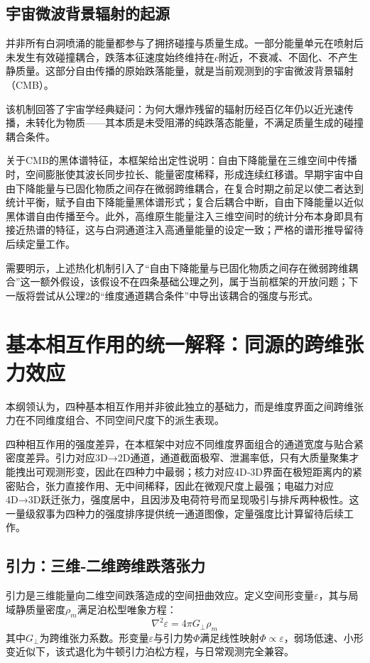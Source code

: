 \documentclass[UTF8]{csoarticle}
\begin{document}
\subsection{宇宙微波背景辐射的起源}
并非所有白洞喷涌的能量都参与了拥挤碰撞与质量生成。一部分能量单元在喷射后未发生有效碰撞耦合，跌落本征速度始终维持在$c$附近，不衰减、不固化、不产生静质量。这部分自由传播的原始跌落能量，就是当前观测到的宇宙微波背景辐射（CMB）。

该机制回答了宇宙学经典疑问：为何大爆炸残留的辐射历经百亿年仍以近光速传播，未转化为物质——其本质是未受阻滞的纯跌落态能量，不满足质量生成的碰撞耦合条件。

关于CMB的黑体谱特征，本框架给出定性说明：自由下降能量在三维空间中传播时，空间膨胀使其波长同步拉长、能量密度稀释，形成连续红移谱。早期宇宙中自由下降能量与已固化物质之间存在微弱跨维耦合，在复合时期之前足以使二者达到统计平衡，赋予自由下降能量黑体谱形式；复合后耦合中断，自由下降能量以近似黑体谱自由传播至今。此外，高维原生能量注入三维空间时的统计分布本身即具有接近热谱的特征，这与白洞通道注入高通量能量的设定一致；严格的谱形推导留待后续定量工作。

需要明示，上述热化机制引入了“自由下降能量与已固化物质之间存在微弱跨维耦合”这一额外假设，该假设不在四条基础公理之列，属于当前框架的开放问题；下一版将尝试从公理2的“维度通道耦合条件”中导出该耦合的强度与形式。

\section{基本相互作用的统一解释：同源的跨维张力效应}
本纲领认为，四种基本相互作用并非彼此独立的基础力，而是维度界面之间跨维张力在不同维度组合、不同空间尺度下的派生表现。

四种相互作用的强度差异，在本框架中对应不同维度界面组合的通道宽度与贴合紧密度差异。引力对应3D→2D通道，通道截面极窄、泄漏率低，只有大质量聚集才能拽出可观测形变，因此在四种力中最弱；核力对应4D‑3D界面在极短距离内的紧密贴合，张力直接作用、无中间稀释，因此在微观尺度上最强；电磁力对应4D→3D跃迁张力，强度居中，且因涉及电荷符号而呈现吸引与排斥两种极性。这一量级叙事为四种力的强度排序提供统一通道图像，定量强度比计算留待后续工作。

\subsection{引力：三维‑二维跨维跌落张力}
引力是三维能量向二维空间跌落造成的空间扭曲效应。定义空间形变量$\varepsilon$，其与局域静质量密度$\rho_m$满足泊松型唯象方程：
\begin{equation}
\nabla^2 \varepsilon = 4\pi G_\perp \rho_m
\end{equation}
其中$G_\perp$为跨维张力系数。形变量$\varepsilon$与引力势$\Phi$满足线性映射$\Phi \propto \varepsilon$，弱场低速、小形变近似下，该式退化为牛顿引力泊松方程，与日常观测完全兼容。
\end{document}
